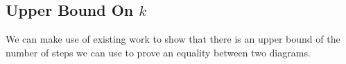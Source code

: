 \documentclass[journal,onecolumn]{IEEEtran}
\begin{document}
\subsection{Upper Bound On $k$}

We can make use of existing work to show that there is an upper bound of the number of steps we can use to prove an equality between two diagrams.

%
%



%
%
\end{document}
